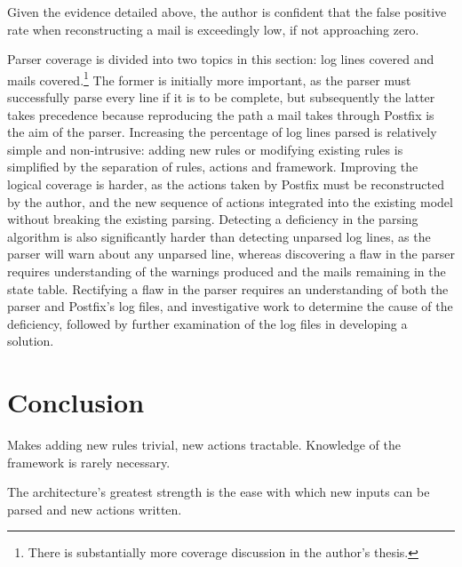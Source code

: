 \documentclass[draft]{svmult}
\begin{document}
Given the evidence detailed above, the author is confident that the false
positive rate when reconstructing a mail is exceedingly low, if not
approaching zero.

Parser coverage is divided into two topics in this section: log lines
covered and mails covered.\footnote{There is substantially more coverage
discussion in the author's thesis.}  The former is initially more
important, as the parser must successfully parse every line if it is to be
complete, but subsequently the latter takes precedence because reproducing
the path a mail takes through Postfix is the aim of the parser.  Increasing
the percentage of log lines parsed is relatively simple and non-intrusive:
adding new rules or modifying existing rules is simplified by the
separation of rules, actions and framework.  Improving the logical coverage
is harder, as the actions taken by Postfix must be reconstructed by the
author, and the new sequence of actions integrated into the existing model
without breaking the existing parsing.  Detecting a deficiency in the
parsing algorithm is also significantly harder than detecting unparsed log
lines, as the parser will warn about any unparsed line, whereas discovering
a flaw in the parser requires understanding of the warnings produced and
the mails remaining in the state table.  Rectifying a flaw in the parser
requires an understanding of both the parser and Postfix's log files, and
investigative work to determine the cause of the deficiency, followed by
further examination of the log files in developing a solution.

\section{Conclusion}

Makes adding new rules trivial, new actions tractable.  Knowledge of the
framework is rarely necessary.

The architecture's greatest strength is the ease with which new inputs
can be parsed and new actions written.



\label{bibliography}

\renewcommand{\glossarytitle}{\section{Glossary}\label{Glossary}}
\printglossary{}

\end{document}
